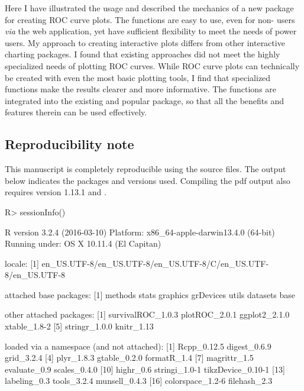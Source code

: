\documentclass[codesnippet]{jss}
\begin{document}
Here I have illustrated the usage and described the mechanics of a new
 package for creating ROC curve plots. The functions are
easy to use, even for non- users \emph{via} the web
application, yet have sufficient flexibility to meet the needs of power
users. My approach to creating interactive plots differs from other
interactive charting packages. I found that existing approaches did not
meet the highly specialized needs of plotting ROC curves. While ROC
curve plots can technically be created with even the most basic plotting
tools, I find that specialized functions make the results clearer and
more informative. The functions are integrated into the existing and
popular  package, so that all the benefits and features
therein can be used effectively.

\subsection{Reproducibility note}\label{reproducibility-note}

This manuscript is completely reproducible using the source files. The
output below indicates the  packages and versions used.
Compiling the pdf output also requires  version 1.13.1 and
.

\begin{Schunk}
\begin{Sinput}
R> sessionInfo()
\end{Sinput}
\begin{Soutput}
R version 3.2.4 (2016-03-10)
Platform: x86_64-apple-darwin13.4.0 (64-bit)
Running under: OS X 10.11.4 (El Capitan)

locale:
[1] en_US.UTF-8/en_US.UTF-8/en_US.UTF-8/C/en_US.UTF-8/en_US.UTF-8

attached base packages:
[1] methods   stats     graphics  grDevices utils     datasets  base     

other attached packages:
[1] survivalROC_1.0.3 plotROC_2.0.1     ggplot2_2.1.0     xtable_1.8-2     
[5] stringr_1.0.0     knitr_1.13       

loaded via a namespace (and not attached):
 [1] Rcpp_0.12.5       digest_0.6.9      grid_3.2.4       
 [4] plyr_1.8.3        gtable_0.2.0      formatR_1.4      
 [7] magrittr_1.5      evaluate_0.9      scales_0.4.0     
[10] highr_0.6         stringi_1.0-1     tikzDevice_0.10-1
[13] labeling_0.3      tools_3.2.4       munsell_0.4.3    
[16] colorspace_1.2-6  filehash_2.3     
\end{Soutput}
\end{Schunk}


%

\end{document}
